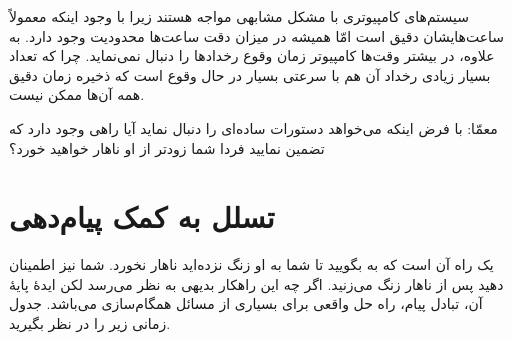 \documentclass{book}
\newcommand{\clearemptydoublepage}{\newpage\cleardoublepage}
\begin{document}

    سیستم‌های کامپیوتری با مشکل مشابهی مواجه هستند زیرا با وجود اینکه معمولاً ساعت‌هایشان دقیق است امّا همیشه 
    در میزان دقت ساعت‌ها محدودیت وجود دارد. به علاوه، در بیشتر وقت‌ها کامپیوتر زمان وقوع رخدادها را دنبال نمی‌نماید. 
    چرا که تعداد بسیار زیادی رخداد آن هم با سرعتی بسیار در حال وقوع است که ذخیره  زمان دقیق همه آن‌ها ممکن نیست. 
    
    معمّا: با فرض اینکه  می‌خواهد دستورات ساده‌ای را دنبال نماید آیا راهی وجود دارد که تضمین نمایید فردا شما زودتر از او ناهار خواهید خورد؟
    
\clearemptydoublepage
\section {تسلل به کمک پیام‌دهی}
\label{serialization}

    یک راه آن است که به  بگویید تا شما به او زنگ نزده‌اید ناهار نخورد. شما نیز  اطمینان دهید پس از ناهار زنگ می‌زنید. 
    اگر چه این راهکار بدیهی به نظر می‌رسد لکن ایدهٔ پایهٔ آن، تبادل پیام، راه حل واقعی برای بسیاری
    از مسائل همگام‌سازی می‌باشد.  جدول زمانی زیر را در نظر بگیرید. 
    
\end{document}
